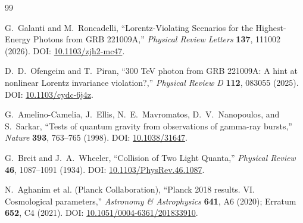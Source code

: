 \begin{thebibliography}{99}

G.~Galanti and M.~Roncadelli,
``Lorentz-Violating Scenarios for the Highest-Energy Photons from GRB 221009A,''
\emph{Physical Review Letters} \textbf{137}, 111002 (2026).
DOI: \href{https://doi.org/10.1103/zjh2-mc47}{10.1103/zjh2-mc47}.

D.~D.~Ofengeim and T.~Piran,
``300 TeV photon from GRB 221009A: A hint at nonlinear Lorentz invariance violation?,''
\emph{Physical Review D} \textbf{112}, 083055 (2025).
DOI: \href{https://doi.org/10.1103/cydc-6j4z}{10.1103/cydc-6j4z}.

G.~Amelino-Camelia, J.~Ellis, N.~E.~Mavromatos, D.~V.~Nanopoulos, and S.~Sarkar,
``Tests of quantum gravity from observations of gamma-ray bursts,''
\emph{Nature} \textbf{393}, 763--765 (1998).
DOI: \href{https://doi.org/10.1038/31647}{10.1038/31647}.

G.~Breit and J.~A.~Wheeler,
``Collision of Two Light Quanta,''
\emph{Physical Review} \textbf{46}, 1087--1091 (1934).
DOI: \href{https://doi.org/10.1103/PhysRev.46.1087}{10.1103/PhysRev.46.1087}.

N.~Aghanim et al. (Planck Collaboration),
``Planck 2018 results. VI. Cosmological parameters,''
\emph{Astronomy \& Astrophysics} \textbf{641}, A6 (2020); Erratum \textbf{652}, C4 (2021).
DOI: \href{https://doi.org/10.1051/0004-6361/201833910}{10.1051/0004-6361/201833910}.

\end{thebibliography}
